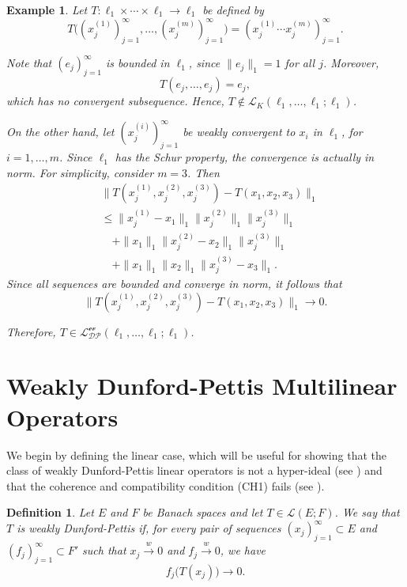 \documentclass[12 pt]{article}%
\newtheorem{example}[theorem]{Example}
\newtheorem{final remark}[theorem]{Final Remark}
\newtheorem{definition}[theorem]{Definition}
\begin{document}
\begin{example}
	Let $T\colon \ell_1 \times \cdots \times \ell_1 \longrightarrow \ell_1$ be defined by
	\begin{equation*}
		T\big((x_j^{(1)})_{j=1}^{\infty},\dots,(x_j^{(m)})_{j=1}^{\infty}\big)
		= (x_j^{(1)}\cdots x_j^{(m)})_{j=1}^{\infty}.
	\end{equation*}
	
	Note that $(e_j)_{j=1}^{\infty}$ is bounded in $\ell_1$, since $\|e_j\|_1 = 1$ for all $j$. 
	Moreover,
	\[
	T(e_j,\dots,e_j) = e_j,
	\]
	which has no convergent subsequence. Hence, $T \notin \mathcal{L}_K(\ell_1,\dots,\ell_1; \ell_1)$.
	
	On the other hand, let $(x_j^{(i)})_{j=1}^{\infty}$ be weakly convergent to $x_i$ in $\ell_1$, 
	for $i=1,\dots,m$. Since $\ell_1$ has the Schur property, the convergence is actually 
	in norm. For simplicity, consider $m=3$. Then
	\begin{align*}
		&\|T(x_j^{(1)},x_j^{(2)},x_j^{(3)}) - T(x_1,x_2,x_3)\|_1 \\
		&\le \|x_j^{(1)} - x_1\|_1 \|x_j^{(2)}\|_1 \|x_j^{(3)}\|_1 \\
		&\quad + \|x_1\|_1 \|x_j^{(2)} - x_2\|_1 \|x_j^{(3)}\|_1 \\
		&\quad + \|x_1\|_1 \|x_2\|_1 \|x_j^{(3)} - x_3\|_1.
	\end{align*}
	Since all sequences are bounded and converge in norm, it follows that
	\[
	\|T(x_j^{(1)},x_j^{(2)},x_j^{(3)}) - T(x_1,x_2,x_3)\|_1 \to 0.
	\]
	
	Therefore, $T \in \mathcal{L_{DP}^{\text{ev}}}(\ell_1,\dots,\ell_1; \ell_1)$.
\end{example}


\section{Weakly Dunford-Pettis Multilinear Operators}

We begin by defining the linear case, which will be useful for showing that the class of weakly Dunford-Pettis linear operators is not a hyper-ideal (see \cite{BT15}) and that the coherence and compatibility condition (CH1) fails (see \cite{PR14}).

\begin{definition}
	Let $E$ and $F$ be Banach spaces and let $T \in \mathcal{L}(E;F)$. We say that $T$ is weakly Dunford-Pettis if, for every pair of sequences $(x_j)_{j=1}^{\infty} \subset E$ and $(f_j)_{j=1}^{\infty} \subset F'$ such that $x_j \overset{w}{\to} 0$ and $f_j \overset{w}{\to} 0$, we have
	\begin{equation*}
		f_j\big(T(x_j)\big) \longrightarrow 0.
	\end{equation*}
\end{definition}
\end{document}
